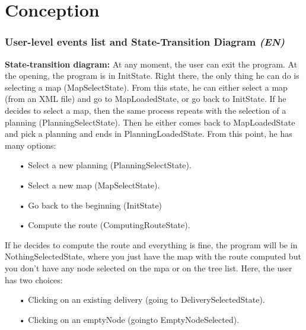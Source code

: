 \documentclass[paper=a4,fontsize=11pt]{report}
\numberwithin{equation}{section}		%
\numberwithin{figure}{section}		%
\numberwithin{table}{section}		%
\renewcommand{\bf}[1]{\textbf{#1}}
\renewcommand{\it}[1]{\textit{#1}}
\begin{document}
\part{Conception}
\label{part:conception}
\setcounter{section}{0}

\section{User-level events list and State-Transition Diagram \it{(EN)}}
\label{sec:user-level-events-list-and-state-transition-diagram}

\bf{State-transition diagram:}
At any moment, the user can exit the program.
At the opening, the program is in InitState. Right there, the only thing he can do is selecting a map (MapSelectState). From this state, he can either select a map (from an XML file) and go to MapLoadedState, or go back to InitState. If he decides to select a map, then the same process repeats with the selection of a planning (PlanningSelectState). Then he either comes back to MapLoadedState and pick a planning and ends in PlanningLoadedState. From this point, he has many options:\\

\begin{itemize}
  \item[•] Select a new planning (PlanningSelectState).
  \item[•] Select a new map (MapSelectState).
  \item[•] Go back to the beginning (InitState)
  \item[•] Compute the route (ComputingRouteState).\\
\end{itemize}

If he decides to compute the route and everything is fine, the program will be in NothingSelectedState, where you just have the map with the route computed but you don't have any node selected on the mpa or on the tree list. Here, the user has two choices:\\

\begin{itemize}
  \item[•] Clicking on an existing delivery (going to DeliverySelectedState).
  \item[•] Clicking on an emptyNode (goingto EmptyNodeSelected).\\
\end{itemize}
\end{document}
